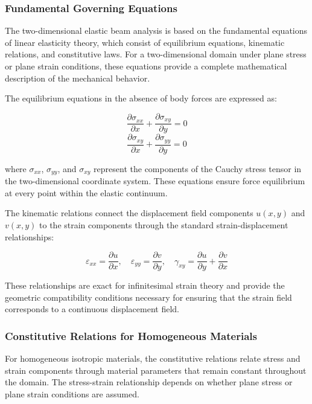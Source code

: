 \documentclass[12pt,a4paper]{report}
\begin{document}
\subsubsection{Fundamental Governing Equations}

The two-dimensional elastic beam analysis is based on the fundamental equations of linear elasticity theory, which consist of equilibrium equations, kinematic relations, and constitutive laws. For a two-dimensional domain under plane stress or plane strain conditions, these equations provide a complete mathematical description of the mechanical behavior.

The equilibrium equations in the absence of body forces are expressed as:

\begin{equation}
\frac{\partial \sigma_{xx}}{\partial x} + \frac{\partial \sigma_{xy}}{\partial y} = 0
\end{equation}
\begin{equation}
\frac{\partial \sigma_{xy}}{\partial x} + \frac{\partial \sigma_{yy}}{\partial y} = 0
\end{equation}

where $\sigma_{xx}$, $\sigma_{yy}$, and $\sigma_{xy}$ represent the components of the Cauchy stress tensor in the two-dimensional coordinate system. These equations ensure force equilibrium at every point within the elastic continuum.

The kinematic relations connect the displacement field components $u(x,y)$ and $v(x,y)$ to the strain components through the standard strain-displacement relationships:

\begin{equation}
\varepsilon_{xx} = \frac{\partial u}{\partial x}, \quad
\varepsilon_{yy} = \frac{\partial v}{\partial y}, \quad
\gamma_{xy} = \frac{\partial u}{\partial y} + \frac{\partial v}{\partial x}
\end{equation}

These relationships are exact for infinitesimal strain theory and provide the geometric compatibility conditions necessary for ensuring that the strain field corresponds to a continuous displacement field.

\subsubsection{Constitutive Relations for Homogeneous Materials}

For homogeneous isotropic materials, the constitutive relations relate stress and strain components through material parameters that remain constant throughout the domain. The stress-strain relationship depends on whether plane stress or plane strain conditions are assumed.
\end{document}
